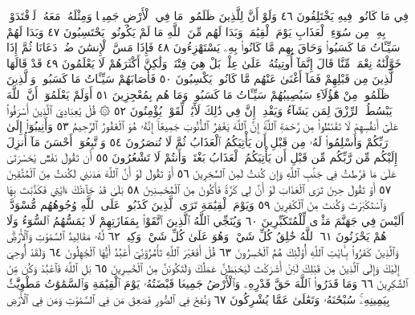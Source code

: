 فِي مَا كَانُوا۟ فِيهِ يَخْتَلِفُونَ ٤٦ وَلَوْ أَنَّ لِلَّذِينَ ظَلَمُوا۟ مَا فِي
ٱلْأَرْضِ جَمِيعࣰا وَمِثْلَهُۥ مَعَهُۥ لَٱفْتَدَوْا۟ بِهِۦ مِن سُوٓءِ ٱلْعَذَابِ
يَوْمَ ٱلْقِيَٰمَةِۚ وَبَدَا لَهُم مِّنَ ٱللَّهِ مَا لَمْ يَكُونُوا۟ يَحْتَسِبُونَ ٤٧
وَبَدَا لَهُمْ سَيِّـَٔاتُ مَا كَسَبُوا۟ وَحَاقَ بِهِم مَّا كَانُوا۟ بِهِۦ
يَسْتَهْزِءُونَ ٤٨ فَإِذَا مَسَّ ٱلْإِنسَٰنَ ضُرࣱّ دَعَانَا ثُمَّ إِذَا خَوَّلْنَٰهُ
نِعْمَةࣰ مِّنَّا قَالَ إِنَّمَآ أُوتِيتُهُۥ عَلَىٰ عِلْمِۭۚ بَلْ هِيَ فِتْنَةࣱ وَلَٰكِنَّ
أَكْثَرَهُمْ لَا يَعْلَمُونَ ٤٩ قَدْ قَالَهَا ٱلَّذِينَ مِن قَبْلِهِمْ فَمَآ
أَغْنَىٰ عَنْهُم مَّا كَانُوا۟ يَكْسِبُونَ ٥٠ فَأَصَابَهُمْ سَيِّـَٔاتُ
مَا كَسَبُوا۟ۚ وَٱلَّذِينَ ظَلَمُوا۟ مِنْ هَٰٓؤُلَآءِ سَيُصِيبُهُمْ سَيِّـَٔاتُ
مَا كَسَبُوا۟ وَمَا هُم بِمُعْجِزِينَ ٥١ أَوَلَمْ يَعْلَمُوٓا۟ أَنَّ ٱللَّهَ يَبْسُطُ
ٱلرِّزْقَ لِمَن يَشَآءُ وَيَقْدِرُۚ إِنَّ فِي ذَٰلِكَ لَأٓيَٰتࣲ لِّقَوْمࣲ يُؤْمِنُونَ ٥٢
۞ قُلْ يَٰعِبَادِيَ ٱلَّذِينَ أَسْرَفُوا۟ عَلَىٰٓ أَنفُسِهِمْ لَا تَقْنَطُوا۟
مِن رَّحْمَةِ ٱللَّهِۚ إِنَّ ٱللَّهَ يَغْفِرُ ٱلذُّنُوبَ جَمِيعًاۚ إِنَّهُۥ هُوَ
ٱلْغَفُورُ ٱلرَّحِيمُ ٥٣ وَأَنِيبُوٓا۟ إِلَىٰ رَبِّكُمْ وَأَسْلِمُوا۟ لَهُۥ مِن
قَبْلِ أَن يَأْتِيَكُمُ ٱلْعَذَابُ ثُمَّ لَا تُنصَرُونَ ٥٤ وَٱتَّبِعُوٓا۟ أَحْسَنَ
مَآ أُنزِلَ إِلَيْكُم مِّن رَّبِّكُم مِّن قَبْلِ أَن يَأْتِيَكُمُ ٱلْعَذَابُ
بَغْتَةࣰ وَأَنتُمْ لَا تَشْعُرُونَ ٥٥ أَن تَقُولَ نَفْسࣱ يَٰحَسْرَتَىٰ
عَلَىٰ مَا فَرَّطتُ فِي جَنۢبِ ٱللَّهِ وَإِن كُنتُ لَمِنَ ٱلسَّٰخِرِينَ ٥٦
أَوْ تَقُولَ لَوْ أَنَّ ٱللَّهَ هَدَىٰنِي لَكُنتُ مِنَ ٱلْمُتَّقِينَ ٥٧ أَوْ تَقُولَ
حِينَ تَرَى ٱلْعَذَابَ لَوْ أَنَّ لِي كَرَّةࣰ فَأَكُونَ مِنَ ٱلْمُحْسِنِينَ ٥٨
بَلَىٰ قَدْ جَآءَتْكَ ءَايَٰتِي فَكَذَّبْتَ بِهَا وَٱسْتَكْبَرْتَ وَكُنتَ
مِنَ ٱلْكَٰفِرِينَ ٥٩ وَيَوْمَ ٱلْقِيَٰمَةِ تَرَى ٱلَّذِينَ كَذَبُوا۟ عَلَى
ٱللَّهِ وُجُوهُهُم مُّسْوَدَّةٌۚ أَلَيْسَ فِي جَهَنَّمَ مَثْوࣰى لِّلْمُتَكَبِّرِينَ ٦٠
وَيُنَجِّي ٱللَّهُ ٱلَّذِينَ ٱتَّقَوْا۟ بِمَفَازَتِهِمْ لَا يَمَسُّهُمُ ٱلسُّوٓءُ
وَلَا هُمْ يَحْزَنُونَ ٦١ ٱللَّهُ خَٰلِقُ كُلِّ شَيْءࣲۖ وَهُوَ عَلَىٰ كُلِّ
شَيْءࣲ وَكِيلࣱ ٦٢ لَّهُۥ مَقَالِيدُ ٱلسَّمَٰوَٰتِ وَٱلْأَرْضِۗ وَٱلَّذِينَ
كَفَرُوا۟ بِـَٔايَٰتِ ٱللَّهِ أُو۟لَٰٓئِكَ هُمُ ٱلْخَٰسِرُونَ ٦٣ قُلْ
أَفَغَيْرَ ٱللَّهِ تَأْمُرُوٓنِّيٓ أَعْبُدُ أَيُّهَا ٱلْجَٰهِلُونَ ٦٤ وَلَقَدْ
أُوحِيَ إِلَيْكَ وَإِلَى ٱلَّذِينَ مِن قَبْلِكَ لَئِنْ أَشْرَكْتَ
لَيَحْبَطَنَّ عَمَلُكَ وَلَتَكُونَنَّ مِنَ ٱلْخَٰسِرِينَ ٦٥ بَلِ
ٱللَّهَ فَٱعْبُدْ وَكُن مِّنَ ٱلشَّٰكِرِينَ ٦٦ وَمَا قَدَرُوا۟ ٱللَّهَ حَقَّ
قَدْرِهِۦ وَٱلْأَرْضُ جَمِيعࣰا قَبْضَتُهُۥ يَوْمَ ٱلْقِيَٰمَةِ وَٱلسَّمَٰوَٰتُ
مَطْوِيَّٰتُۢ بِيَمِينِهِۦۚ سُبْحَٰنَهُۥ وَتَعَٰلَىٰ عَمَّا يُشْرِكُونَ ٦٧
وَنُفِخَ فِي ٱلصُّورِ فَصَعِقَ مَن فِي ٱلسَّمَٰوَٰتِ وَمَن فِي ٱلْأَرْضِ
